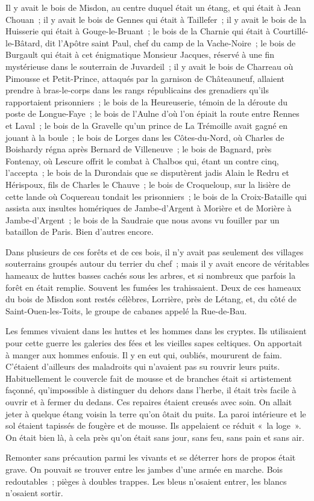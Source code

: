 \documentclass[french,twoside]{book} %
\begin{document}
Il y avait le bois de Misdon, au centre duquel était un étang, et qui était à Jean Chouan ; il y avait le bois de Gennes qui était à Taillefer ; il y avait le bois de la Huisserie qui était à Gouge-le-Bruant ; le bois de la Charnie qui était à Courtillé-le-Bâtard, dit l’Apôtre saint Paul, chef du camp de la Vache-Noire ; le bois de Burgault qui était à cet énigmatique Monsieur Jacques, réservé à une fin mystérieuse dans le souterrain de Juvardeil ; il y avait le bois de Charreau  où Pimousse et Petit-Prince, attaqués par la garnison de Châteauneuf, allaient prendre à bras-le-corps dans les rangs républicains des grenadiers qu’ils rapportaient prisonniers ; le bois de la Heureuserie, témoin de la déroute du poste de Longue-Faye ; le bois de l’Aulne d’où l’on épiait la route entre Rennes et Laval ; le bois de la Gravelle qu’un prince de La Trémoille avait gagné en jouant à la boule ; le bois de Lorges dans les Côtes-du-Nord, où Charles de Boishardy régna après Bernard de Villeneuve ; le bois de Bagnard, près Fontenay, où Lescure offrit le combat à Chalbos qui, étant un contre cinq, l’accepta ; le bois de la Durondais que se disputèrent jadis Alain le Redru et Hérispoux, fils de Charles le Chauve ; le bois de Croqueloup, sur la lisière de cette lande où Coquereau tondait les prisonniers ; le bois de la Croix-Bataille qui assista aux insultes homériques de Jambe-d’Argent à Morière et de Morière à Jambe-d’Argent ; le bois de la Saudraie que nous avons vu fouiller par un bataillon de Paris. Bien d’autres encore.\par
Dans plusieurs de ces forêts et de ces bois, il n’y avait pas seulement des villages souterrains groupés autour du terrier du chef ; mais il y avait encore de véritables hameaux de huttes basses cachés sous les arbres, et si nombreux que parfois la forêt en était remplie. Souvent les fumées les trahissaient. Deux de ces hameaux du bois de Misdon sont restés célèbres, Lorrière, près de Létang, et, du côté de Saint-Ouen-les-Toits, le groupe de cabanes appelé la Rue-de-Bau.\par
Les femmes vivaient dans les huttes et les hommes  dans les cryptes. Ils utilisaient pour cette guerre les galeries des fées et les vieilles sapes celtiques. On apportait à manger aux hommes enfouis. Il y en eut qui, oubliés, moururent de faim. C’étaient d’ailleurs des maladroits qui n’avaient pas su rouvrir leurs puits. Habituellement le couvercle fait de mousse et de branches était si artistement façonné, qu’impossible à distinguer du dehors dans l’herbe, il était très facile à ouvrir et à fermer du dedans. Ces repaires étaient creusés avec soin. On allait jeter à quelque étang voisin la terre qu’on ôtait du puits. La paroi intérieure et le sol étaient tapissés de fougère et de mousse. Ils appelaient ce réduit « la loge ». On était bien là, à cela près qu’on était sans jour, sans feu, sans pain et sans air.\par
Remonter sans précaution parmi les vivants et se déterrer hors de propos était grave. On pouvait se trouver entre les jambes d’une armée en marche. Bois redoutables ; pièges à doubles trappes. Les bleus n’osaient entrer, les blancs n’osaient sortir.
\end{document}

